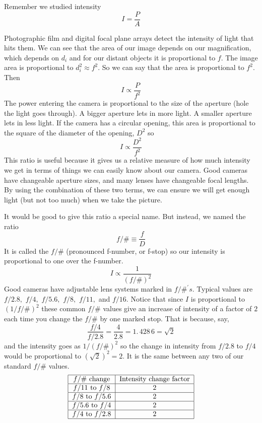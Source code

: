 \documentclass{article}
\begin{document}
Remember we studied intensity%
\[
I=\frac{P}{A} 
\]

Photographic film and digital focal plane arrays detect the intensity of
light that hits them. We can see that the area of our image depends on our
magnification, which depends on $d_{i}$ and for our distant objects it is
proportional to $f.$ The image area is proportional to $d_{i}^{2}\approx
f^{2}.$ So we can say that the area is proportional to $f^{2}.$ Then 
\[
I\propto \frac{P}{f^{2}} 
\]%
The power entering the camera is proportional to the size of the aperture
(hole the light goes through). A bigger aperture lets in more light. A
smaller aperture lets in less light. If the camera has a circular opening,
this area is proportional to the square of the diameter of the opening, $%
D^{2}$ so%
\[
I\propto \frac{D^{2}}{f^{2}} 
\]%
This ratio is useful because it gives us a relative measure of how much
intensity we get in terms of things we can easily know about our camera.
Good cameras have changeable aperture sizes, and many lenses have changeable
focal lengths. By using the combination of these two terms, we can ensure we
will get enough light (but not too much) when we take the picture.

It would be good to give this ratio a special name. But instead, we named
the ratio 
\begin{equation}
f/\#\equiv \frac{f}{D}
\end{equation}%
It is called the $f/\#$ (pronounced f-number, or f-stop) so our intensity is
proportional to one over the f-number. 
\begin{equation}
I\propto \frac{1}{\left( f/\#\right) ^{2}}
\end{equation}%
Good cameras have adjustable lens systems marked in $f/\#^{\prime }s$.
Typical values are $f/2.8,$ $f/4,$ $f/5.6,$ $f/8,$ $f/11,$ and $f/16.$
Notice that since $I$ is proportional to $\left( 1/f/\#\right) ^{2}$ these
common $f/\#$ values give an increase of intensity of a factor of $2$ each
time you change the $f/\#$ by one marked stop. That is because, say, 
\[
\frac{f/4}{f/2.8}=\frac{4}{2.8}=1.\,\allowbreak 428\,6\allowbreak =\sqrt{2} 
\]
and the intensity goes as $1/\left( f/\#\right) ^{2}$ so the change in
intensity from $f/2.8$ to $f/4$ would be proportional to $\left( \sqrt{2}%
\right) ^{2}=2.$ It is the same between any two of our standard $f/\#$
values.%
\[
\begin{tabular}{|c|c|}
\hline
$f/\#$ change & Intensity change factor \\ \hline
$f/11$ to $f/8$ & $2$ \\ \hline
$f/8$ to $f/5.6$ & $2$ \\ \hline
$f/5.6$ to $f/4$ & $2$ \\ \hline
$f/4$ to $f/2.8$ & $2$ \\ \hline
\end{tabular}%
\]
\end{document}
